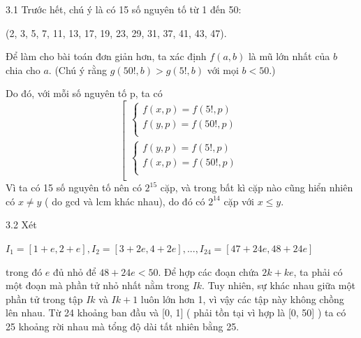 \begin{Answer}{3.1}
Trước hết, chú ý là có 15 số nguyên tố từ 1 đến 50:

(2, 3, 5, 7, 11, 13, 17, 19, 23, 29, 31, 37, 41, 43, 47).

Để làm cho bài toán đơn giản hơn, ta xác định $f(a,b)$ là mũ lớn nhất của $b$ chia cho $a$. (Chú ý rằng $g(50!, b) > g(5!,b)$ với mọi $b < 50$.)

Do đó, với mỗi số nguyên tố p, ta có
\[
\left[ \begin{array}{l}
 \left\{ \begin{array}{l}
 f\left( {x,p} \right) = f\left( {5!,p} \right) \\
 f\left( {y,p} \right) = f\left( {50!,p} \right) \\
 \end{array} \right. \\
 \left\{ \begin{array}{l}
 f\left( {y,p} \right) = f\left( {5!,p} \right) \\
 f\left( {x,p} \right) = f\left( {50!,p} \right) \\
 \end{array} \right. \\
 \end{array} \right.
\]
Vì ta có 15 số nguyên tố nên có $2^{15} $ cặp, và trong bất kì cặp nào cũng hiển nhiên có $x \ne y$ ( do gcd và lcm khác nhau), do đó có  $2^{14} $ cặp với $x \le y$.
\end{Answer}
\begin{Answer}{3.2}
 Xét

$I_1  = \left[ {1 + e,2 + e} \right],I_2  = \left[ {3 + 2e,4 + 2e} \right],...,I_{24}  = \left[ {47 + 24e,48 + 24e} \right]$

trong đó $e$ đủ nhỏ để $48 + 24e < 50$. Để hợp các đoạn chứa $2k + ke$, ta phải có một đoạn mà phần tử nhỏ nhất nằm trong $Ik$. Tuy nhiên, sự khác nhau giữa một phần tử trong tập $Ik$ và $Ik+1$ luôn lớn hơn 1, vì vậy các tập này không chồng lên nhau.
Từ 24 khoảng ban đầu và [0, 1] ( phải tồn tại vì hợp là [0, 50] ) ta có 25 khoảng rời nhau mà tổng độ dài tất nhiên bằng 25.
\end{Answer}
